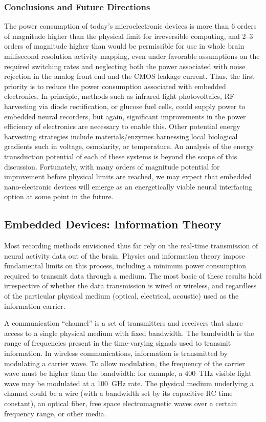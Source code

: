 \subsubsection{Conclusions and Future Directions}
The power consumption of today's microelectronic devices is more than 6 orders of magnitude higher than the physical limit for irreversible computing, and 2--3 orders of magnitude higher than would be permissible for use in whole brain millisecond resolution activity mapping, even under favorable assumptions on the required switching rates and neglecting both the power associated with noise rejection in the analog front end and the CMOS leakage current.
Thus, the first priority is to reduce the power consumption associated with embedded electronics.
In principle, methods such as infrared light photovoltaics, RF harvesting via diode rectification, or glucose fuel cells, could supply power to embedded neural recorders, but again, significant improvements in the power efficiency of electronics are necessary to enable this.
Other potential energy harvesting strategies include materials/enzymes harnessing local biological gradients such in voltage, osmolarity, or temperature.
An analysis of the energy transduction potential of each of these systems is beyond the scope of this discussion.
Fortunately, with many orders of magnitude potential for improvement before physical limits are reached, we may expect that embedded nano-electronic devices will emerge as an energetically viable neural interfacing option at some point in the future.

\subsection{Embedded Devices: Information Theory}

Most recording methods envisioned thus far rely on the real-time transmission of neural activity data out of the brain.
Physics and information theory impose fundamental limits on this process, including a minimum power consumption required to transmit data through a medium.
The most basic of these results hold irrespective of whether the data transmission is wired or wireless, and regardless of the particular physical medium (optical, electrical, acoustic) used as the information carrier.

A communication ``channel'' is a set of transmitters and receivers that share access to a single physical medium with fixed bandwidth.
The bandwidth is the range of frequencies present in the time-varying signals used to transmit information.
In wireless communications, information is transmitted by modulating a carrier wave.
To allow modulation, the frequency of the carrier wave must be higher than the bandwidth: for example, a \SI{400}{\tera\hertz} visible light wave may be modulated at a \SI{100}{\giga\hertz} rate.
The physical medium underlying a channel could be a wire (with a bandwidth set by its capacitive RC time constant), an optical fiber, free space electromagnetic waves over a certain frequency range, or other media.

